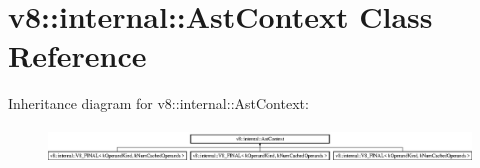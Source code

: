 \hypertarget{classv8_1_1internal_1_1_ast_context}{}\section{v8\+:\+:internal\+:\+:Ast\+Context Class Reference}
\label{classv8_1_1internal_1_1_ast_context}
Inheritance diagram for v8\+:\+:internal\+:\+:Ast\+Context\+:\begin{figure}[H]
\begin{center}
\leavevmode
\includegraphics[height=0.952381cm]{classv8_1_1internal_1_1_ast_context}
\end{center}
\end{figure}
